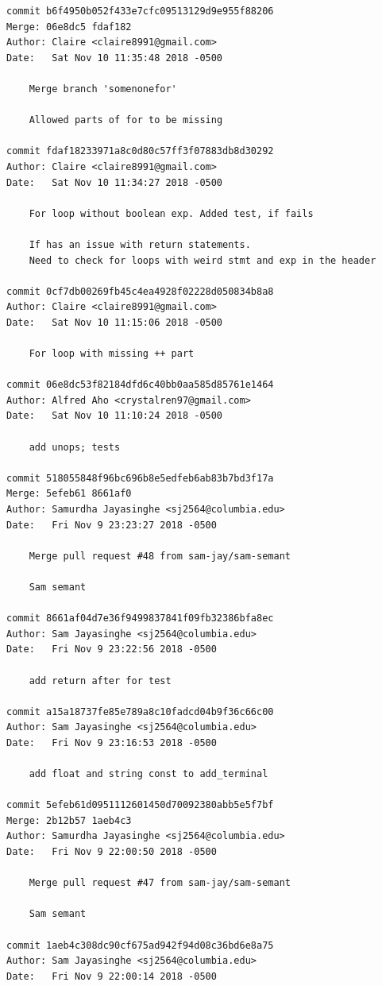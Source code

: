 \documentclass[12pt]{article}
\begin{document}
\begin{lstlisting}
commit b6f4950b052f433e7cfc09513129d9e955f88206
Merge: 06e8dc5 fdaf182
Author: Claire <claire8991@gmail.com>
Date:   Sat Nov 10 11:35:48 2018 -0500

    Merge branch 'somenonefor'
    
    Allowed parts of for to be missing

commit fdaf18233971a8c0d80c57ff3f07883db8d30292
Author: Claire <claire8991@gmail.com>
Date:   Sat Nov 10 11:34:27 2018 -0500

    For loop without boolean exp. Added test, if fails
    
    If has an issue with return statements.
    Need to check for loops with weird stmt and exp in the header

commit 0cf7db00269fb45c4ea4928f02228d050834b8a8
Author: Claire <claire8991@gmail.com>
Date:   Sat Nov 10 11:15:06 2018 -0500

    For loop with missing ++ part

commit 06e8dc53f82184dfd6c40bb0aa585d85761e1464
Author: Alfred Aho <crystalren97@gmail.com>
Date:   Sat Nov 10 11:10:24 2018 -0500

    add unops; tests

commit 518055848f96bc696b8e5edfeb6ab83b7bd3f17a
Merge: 5efeb61 8661af0
Author: Samurdha Jayasinghe <sj2564@columbia.edu>
Date:   Fri Nov 9 23:23:27 2018 -0500

    Merge pull request #48 from sam-jay/sam-semant
    
    Sam semant

commit 8661af04d7e36f9499837841f09fb32386bfa8ec
Author: Sam Jayasinghe <sj2564@columbia.edu>
Date:   Fri Nov 9 23:22:56 2018 -0500

    add return after for test

commit a15a18737fe85e789a8c10fadcd04b9f36c66c00
Author: Sam Jayasinghe <sj2564@columbia.edu>
Date:   Fri Nov 9 23:16:53 2018 -0500

    add float and string const to add_terminal

commit 5efeb61d0951112601450d70092380abb5e5f7bf
Merge: 2b12b57 1aeb4c3
Author: Samurdha Jayasinghe <sj2564@columbia.edu>
Date:   Fri Nov 9 22:00:50 2018 -0500

    Merge pull request #47 from sam-jay/sam-semant
    
    Sam semant

commit 1aeb4c308dc90cf675ad942f94d08c36bd6e8a75
Author: Sam Jayasinghe <sj2564@columbia.edu>
Date:   Fri Nov 9 22:00:14 2018 -0500


\end{lstlisting}
\end{document}

